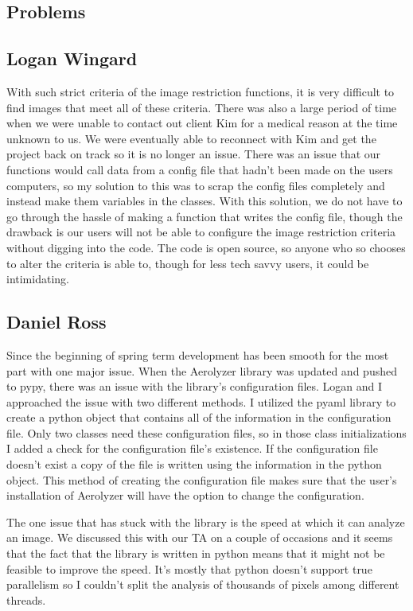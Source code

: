 \documentclass[onecolumn, draftclsnofoot,10pt, compsoc]{IEEEtran}
\begin{document}
\begin{singlespace}
	\section{Problems}
		
		\subsection{Logan Wingard}
			With such strict criteria of the image restriction functions, it is very difficult to find images that meet all of these criteria.
			There was also a large period of time when we were unable to contact out client Kim for a medical reason at the time unknown to us.
			We were eventually able to reconnect with Kim and get the project back on track so it is no longer an issue.
			There was an issue that our functions would call data from a config file that hadn't been made on the users computers, so my solution to this was to scrap the config files completely and instead make them variables in the classes.
			With this solution, we do not have to go through the hassle of making a function that writes the config file, though the drawback is our users will not be able to configure the image restriction criteria without digging into the code.
			The code is open source, so anyone who so chooses to alter the criteria is able to, though for less tech savvy users, it could be intimidating. 
		\subsection{Daniel Ross}
			Since the beginning of spring term development has been smooth for the most part with one major issue.
			When the Aerolyzer library was updated and pushed to pypy, there was an issue with the library's configuration files.
			Logan and I approached the issue with two different methods.
			I utilized the pyaml library to create a python object that contains all of the information in the configuration file.
			Only two classes need these configuration files, so in those class initializations I added a check for the configuration file's existence.
			If the configuration file doesn't exist a copy of the file is written using the information in the python object.
			This method of creating the configuration file makes sure that the user's installation of Aerolyzer will have the option to change the configuration.
			
			The one issue that has stuck with the library is the speed at which it can analyze an image.
			We discussed this with our TA on a couple of occasions and it seems that the fact that the library is written in python means that it might not be feasible to improve the speed.
			It's mostly that python doesn't support true parallelism so I couldn't split the analysis of thousands of pixels among different threads.
			

\end{singlespace}
\end{document}
